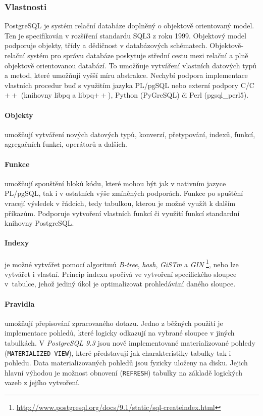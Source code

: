 \documentclass[a4paper,12pt,oneside]{report}
\begin{document}
\subsubsection{Vlastnosti}
PostgreSQL je systém relační databáze doplněný o objektově orientovaný
model. Ten je specifikován v rozšíření standardu SQL3 z roku
1999\cite{sql1999}. Objektový model podporuje objekty, třídy a
dědičnost v databázových schématech. Objektově-relační systém pro
správu databáze poskytuje střední cestu mezi relační a plně objektově
orientovanou databází. To umožňuje vytváření vlastních
datových typů a metod, které umožňují vyšší míru abstrakce. Nechybí
podpora implementace vlastních procedur buď s využitím 
jazyka PL/pgSQL nebo externí podpory C/C$++$ (knihovny libpq a
libpq$++$), Python (PyGreSQL) či Perl (pgsql\_perl5).


\paragraph{Objekty} umožňují vytváření nových datových typů, konverzí,
přetypování, indexů, funkcí, agregačních funkci, operátorů a dalších.

\paragraph*{Funkce} umožňují spouštění bloků kódu, které mohou být jak
v nativním jazyce PL/pgSQL, tak i v ostatních výše zmíněných
podporách. Funkce po spuštění vracejí výsledek v řádcích, tedy
tabulkou, kterou je možné využít k dalším příkazům. Podporuje
vytvoření vlastních funkcí či využití funkcí  standardní knihovny
PostgreSQL.

\paragraph*{Indexy} je možné vytvářet pomocí algoritmů
\textit{B-tree}, \textit{hash}, \textit{GiSTm} a \textit{GIN}
\footnote{\url{http://www.postgresql.org/docs/9.1/static/sql-createindex.html}},
nebo lze vytvářet i vlastní. Princip indexu spočívá ve vytvoření
specifického sloupce v~tabulce, jehož jediný úkol je optimalizovat
prohledávání daného sloupce.

\paragraph*{Pravidla} umožňují přepisování zpracovaného dotazu. 
Jedno z běžných použití je implementace pohledů, které logicky odkazují na vybrané sloupce v
jiných tabul\-kách. V \textit{PostgreSQL 9.3 } jsou nově implementované
materializované pohledy (\texttt{MATERIALIZED VIEW}), které
představují jak charakteristiky tabulky tak i pohledu. Data
materializovaných pohledů jsou fyzicky uloženy na disku. Jejich hlavní
výhodou je možnost  obnovení (\texttt{REFRESH})  tabulky na základě logických vazeb z jejího vytvoření.
\end{document}
